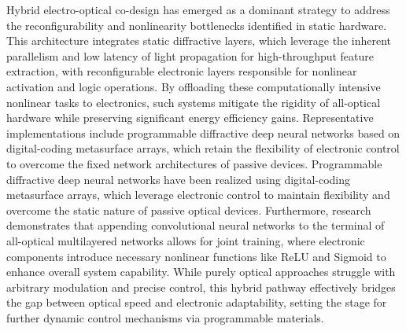 \documentclass[11pt]{article}
\begin{document}
Hybrid electro-optical co-design has emerged as a dominant strategy to address the reconfigurability and nonlinearity bottlenecks identified in static hardware. This architecture integrates static diffractive layers, which leverage the inherent parallelism and low latency of light propagation for high-throughput feature extraction, with reconfigurable electronic layers responsible for nonlinear activation and logic operations. By offloading these computationally intensive nonlinear tasks to electronics, such systems mitigate the rigidity of all-optical hardware while preserving significant energy efficiency gains. Representative implementations include programmable diffractive deep neural networks based on digital-coding metasurface arrays, which retain the flexibility of electronic control to overcome the fixed network architectures of passive devices. Programmable diffractive deep neural networks have been realized using digital-coding metasurface arrays, which leverage electronic control to maintain flexibility and overcome the static nature of passive optical devices. \citep{doi_10_1038_s41928_022_00719_9_a2169947} Furthermore, research demonstrates that appending convolutional neural networks to the terminal of all-optical multilayered networks allows for joint training, where electronic components introduce necessary nonlinear functions like ReLU and Sigmoid to enhance overall system capability. While purely optical approaches struggle with arbitrary modulation and precise control, this hybrid pathway effectively bridges the gap between optical speed and electronic adaptability, setting the stage for further dynamic control mechanisms via programmable materials. \citep{doi_10_3390_nano14221812_4d7d91b1} \citep{doi_10_1038_s41928_022_00719_9_a2169947} \citep{doi_10_1126_sciadv_adu0904_786138ff}
\end{document}

